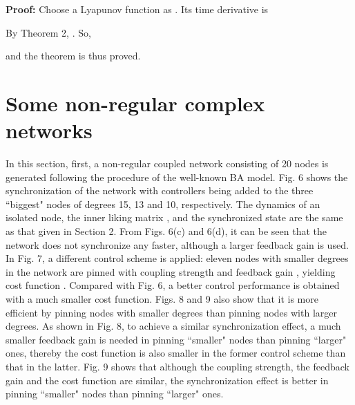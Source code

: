\documentclass[11pt]{article}
\begin{document}
{\bf Proof:} Choose a Lyapunov function as
. Its time derivative is

By \textrm{Theorem 2}, . So,

and the theorem is thus proved. \hfill 

\section{Some non-regular complex networks}

\quad In this section, first, a non-regular coupled network
consisting of 20 nodes is generated following the procedure of the
well-known BA model. Fig. 6 shows the synchronization of the network
with controllers being added to the three ``biggest" nodes of
degrees 15, 13 and 10, respectively. The dynamics of an isolated
node, the inner liking matrix , and the synchronized state
are the same as that given in Section 2. From Figs. 6(c) and 6(d),
it can be seen that the network does not synchronize any faster,
although a larger feedback gain is used. In Fig. 7, a different
control scheme is applied: eleven nodes with smaller degrees in the
network are pinned with coupling strength  and feedback gain
, yielding cost function . Compared with Fig.
6, a better control performance is obtained with a much smaller cost
function. Figs. 8 and 9 also show that it is more efficient by
pinning nodes with smaller degrees than pinning nodes with larger
degrees. As shown in Fig. 8, to achieve a similar synchronization
effect, a much smaller feedback gain is needed in pinning ``smaller"
nodes than pinning ``larger" ones, thereby the cost function is also
smaller in the former control scheme than that in the latter. Fig. 9
shows that although the coupling strength, the feedback gain and the
cost function are similar, the synchronization effect is better in
pinning ``smaller" nodes than pinning ``larger" ones.
\begin{center}
\quad \unitlength=1cm \hbox{\hspace*{0.1cm} 
 \quad {}
 }
\end{center}
\vskip-0.6cm \qquad\qquad\qquad\qquad{}
\begin{center}
\quad \unitlength=1cm \hbox{\hspace*{0.1cm} 
 \quad {}
 }
\end{center}
\end{document}
